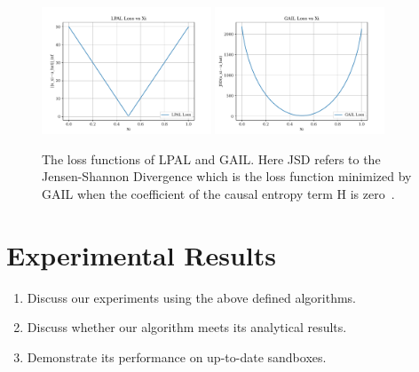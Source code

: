 \documentclass[10pt]{article}
\renewcommand{\cite}{\citep}
\begin{document}
\begin{figure}[htbp]
	\centering
	\includegraphics[width=0.45\textwidth]{../src/plots/all_state/lpal_loss.pdf}
	\includegraphics[width=0.45\textwidth]{../src/plots/all_state/gail_loss.pdf}
	\caption{The loss functions of LPAL and GAIL. Here JSD refers to the Jensen-Shannon Divergence which is the loss function minimized by GAIL when the coefficient of the 
 causal entropy term H is zero~\cite{Ho2016}.}
	\label{fig:loss_of_LPAL_GAIL}
\end{figure}


\section{Experimental Results}
\label{sec:experimental-results}
\begin{enumerate}
	\item Discuss our experiments using the above defined algorithms.
	\item Discuss whether our algorithm meets its analytical results.
	\item Demonstrate its performance on up-to-date sandboxes.
\end{enumerate}
\end{document}
